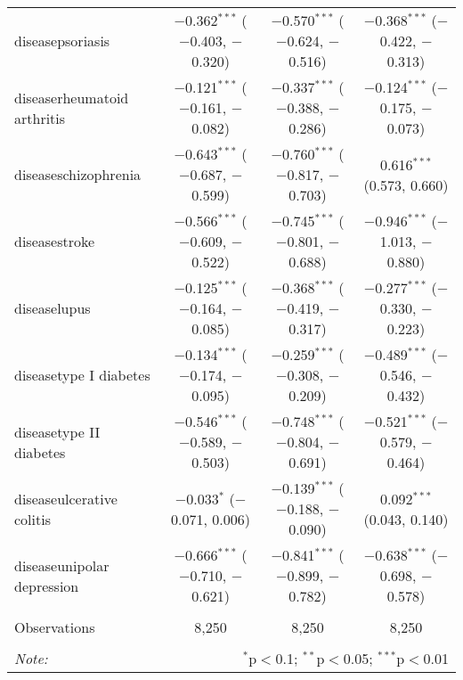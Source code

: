 \begin{table}[!htbp]
\begin{tabular}{@{\extracolsep{5pt}}lccc}
  diseasepsoriasis & $-$0.362$^{***}$ ($-$0.403, $-$0.320) & $-$0.570$^{***}$ ($-$0.624, $-$0.516) & $-$0.368$^{***}$ ($-$0.422, $-$0.313) \\ 
  diseaserheumatoid arthritis & $-$0.121$^{***}$ ($-$0.161, $-$0.082) & $-$0.337$^{***}$ ($-$0.388, $-$0.286) & $-$0.124$^{***}$ ($-$0.175, $-$0.073) \\ 
  diseaseschizophrenia & $-$0.643$^{***}$ ($-$0.687, $-$0.599) & $-$0.760$^{***}$ ($-$0.817, $-$0.703) & 0.616$^{***}$ (0.573, 0.660) \\ 
  diseasestroke & $-$0.566$^{***}$ ($-$0.609, $-$0.522) & $-$0.745$^{***}$ ($-$0.801, $-$0.688) & $-$0.946$^{***}$ ($-$1.013, $-$0.880) \\ 
  diseaselupus & $-$0.125$^{***}$ ($-$0.164, $-$0.085) & $-$0.368$^{***}$ ($-$0.419, $-$0.317) & $-$0.277$^{***}$ ($-$0.330, $-$0.223) \\ 
  diseasetype I diabetes & $-$0.134$^{***}$ ($-$0.174, $-$0.095) & $-$0.259$^{***}$ ($-$0.308, $-$0.209) & $-$0.489$^{***}$ ($-$0.546, $-$0.432) \\ 
  diseasetype II diabetes & $-$0.546$^{***}$ ($-$0.589, $-$0.503) & $-$0.748$^{***}$ ($-$0.804, $-$0.691) & $-$0.521$^{***}$ ($-$0.579, $-$0.464) \\ 
  diseaseulcerative colitis & $-$0.033$^{*}$ ($-$0.071, 0.006) & $-$0.139$^{***}$ ($-$0.188, $-$0.090) & 0.092$^{***}$ (0.043, 0.140) \\ 
  diseaseunipolar depression & $-$0.666$^{***}$ ($-$0.710, $-$0.621) & $-$0.841$^{***}$ ($-$0.899, $-$0.782) & $-$0.638$^{***}$ ($-$0.698, $-$0.578) \\ 
 \hline \\[-1.8ex] 
Observations & 8,250 & 8,250 & 8,250 \\ 
\hline 
\hline \\[-1.8ex] 
\textit{Note:}  & \multicolumn{3}{r}{$^{*}$p$<$0.1; $^{**}$p$<$0.05; $^{***}$p$<$0.01} \\ 
\end{tabular} 
\end{table} 
